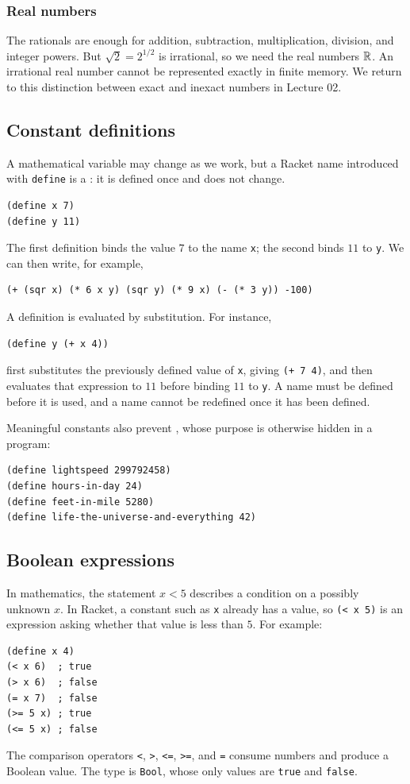 \subsubsection{Real numbers}
The rationals are enough for addition, subtraction, multiplication, division,
and integer powers.  But $\sqrt{2}=2^{1/2}$ is irrational, so we need the real
numbers $\mathbb{R}$.  An irrational real number cannot be represented exactly in
finite memory.  We return to this distinction between exact and inexact
numbers in Lecture 02.

\subsection{Constant definitions}
A mathematical variable may change as we work, but a Racket name introduced
with \texttt{define} is a : it is defined once and does not
change.
\begin{verbatim}
(define x 7)
(define y 11)
\end{verbatim}
The first definition binds the value $7$ to the name \texttt{x}; the second
binds $11$ to \texttt{y}.  We can then write, for example,
\begin{verbatim}
(+ (sqr x) (* 6 x y) (sqr y) (* 9 x) (- (* 3 y)) -100)
\end{verbatim}

A definition is evaluated by substitution.  For instance,
\begin{verbatim}
(define y (+ x 4))
\end{verbatim}
first substitutes the previously defined value of \texttt{x}, giving
\texttt{(+ 7 4)}, and then evaluates that expression to $11$ before binding
$11$ to \texttt{y}.  A name must be defined before it is used, and a name
cannot be redefined once it has been defined.

Meaningful constants also prevent , whose purpose is
otherwise hidden in a program:
\begin{verbatim}
(define lightspeed 299792458)
(define hours-in-day 24)
(define feet-in-mile 5280)
(define life-the-universe-and-everything 42)
\end{verbatim}

\subsection{Boolean expressions}
In mathematics, the statement $x<5$ describes a condition on a possibly
unknown $x$.  In Racket, a constant such as \texttt{x} already has a value, so
\texttt{(< x 5)} is an expression asking whether that value is less than $5$.
For example:
\begin{verbatim}
(define x 4)
(< x 6)  ; true
(> x 6)  ; false
(= x 7)  ; false
(>= 5 x) ; true
(<= 5 x) ; false
\end{verbatim}
The comparison operators \texttt{<}, \texttt{>}, \texttt{<=}, \texttt{>=}, and
\texttt{=} consume numbers and produce a Boolean value.  The type is
\texttt{Bool}, whose only values are \texttt{true} and \texttt{false}.

